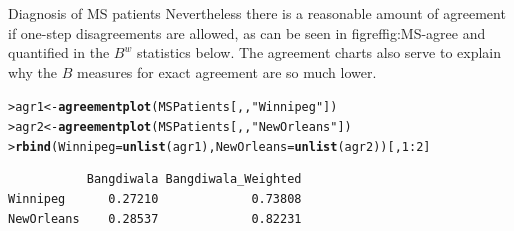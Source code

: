\documentclass[10pt,krantz2]{krantz}\usepackage[]{graphicx}\usepackage[]{color}
\makeatletter
\newcommand{\hlnum}[1]{\textcolor[rgb]{0.686,0.059,0.569}{#1}}%
\newcommand{\hlstr}[1]{\textcolor[rgb]{0.192,0.494,0.8}{#1}}%
\newcommand{\hlopt}[1]{\textcolor[rgb]{0,0,0}{#1}}%
\newcommand{\hlstd}[1]{\textcolor[rgb]{0.345,0.345,0.345}{#1}}%
\newcommand{\hlkwb}[1]{\textcolor[rgb]{0.69,0.353,0.396}{#1}}%
\newcommand{\hlkwc}[1]{\textcolor[rgb]{0.333,0.667,0.333}{#1}}%
\newcommand{\hlkwd}[1]{\textcolor[rgb]{0.737,0.353,0.396}{\textbf{#1}}}%
\newenvironment{kframe}{%
 \def\at@end@of@kframe{}%
 \ifinner\ifhmode%
  \def\at@end@of@kframe{\end{minipage}}%
  \begin{minipage}{\columnwidth}%
 \fi\fi%
 \def\FrameCommand##1{\hskip\@totalleftmargin \hskip-\fboxsep
 \colorbox{shadecolor}{##1}\hskip-\fboxsep
     \hskip-\linewidth \hskip-\@totalleftmargin \hskip\columnwidth}%
 \MakeFramed {\advance\hsize-\width
   \@totalleftmargin\z@ \linewidth\hsize
   \@setminipage}}%
 {\par\unskip\endMakeFramed%
 \at@end@of@kframe}
\newenvironment{knitrout}{}{} %
\renewenvironment{knitrout}{\small\renewcommand{\baselinestretch}{.85}}{} %
\makeatother
\begin{document}
\begin{Example}[MS2]{Diagnosis of MS patients}
Nevertheless there is a reasonable amount of agreement if one-step
disagreements are allowed, as can be seen in figref{fig:MS-agree}
and quantified in the $B^w$ statistics below.
The agreement charts also serve to explain why the $B$ measures for
exact agreement are so much lower.
\begin{knitrout}
\color{fgcolor}\begin{kframe}
\begin{alltt}
\hlstd{> }\hlstd{agr1} \hlkwb{<-} \hlkwd{agreementplot}\hlstd{(MSPatients[, ,} \hlstr{"Winnipeg"}\hlstd{])}
\hlstd{> }\hlstd{agr2} \hlkwb{<-} \hlkwd{agreementplot}\hlstd{(MSPatients[, ,} \hlstr{"New Orleans"}\hlstd{])}
\hlstd{> }\hlkwd{rbind}\hlstd{(}\hlkwc{Winnipeg} \hlstd{=} \hlkwd{unlist}\hlstd{(agr1),} \hlkwc{NewOrleans} \hlstd{=} \hlkwd{unlist}\hlstd{(agr2))[,} \hlnum{1} \hlopt{:} \hlnum{2}\hlstd{]}
\end{alltt}
\begin{verbatim}
           Bangdiwala Bangdiwala_Weighted
Winnipeg      0.27210             0.73808
NewOrleans    0.28537             0.82231
\end{verbatim}
\end{kframe}
\end{knitrout}

\end{Example}
\end{document}
